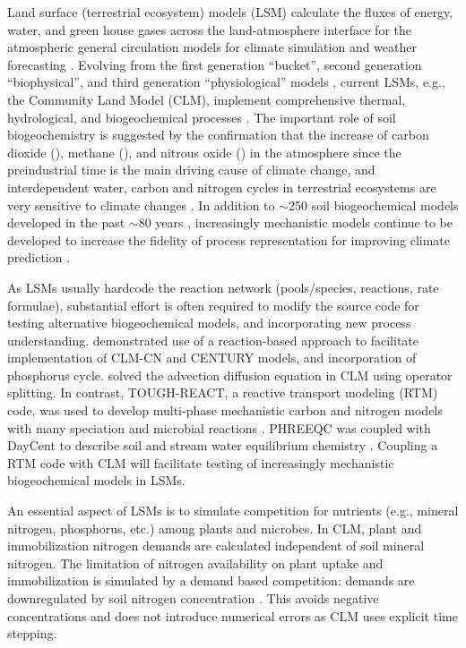 \documentclass[gmd, manuscript]{copernicus}
\begin{document}
\introduction  %
Land surface (terrestrial ecosystem) models (LSM) calculate the fluxes of energy, water, and green house gases across the land-atmosphere interface for
the atmospheric general circulation models for climate simulation and weather forecasting \citep{Sellers1997}. Evolving from the first generation ``bucket'',
second generation ``biophysical'', and third generation ``physiological'' models \citep{Seneviratne2010}, current LSMs, e.g., the Community Land Model (CLM), implement comprehensive thermal, hydrological, and biogeochemical processes \citep{Oleson2013}. The important role of soil biogeochemistry is suggested by the confirmation that the increase of carbon dioxide (), methane (), and nitrous oxide () in the atmosphere since the preindustrial time is the main driving cause of climate change, and interdependent water, carbon and nitrogen cycles in terrestrial ecosystems are very sensitive to climate changes \citep{IPCC2013}. In addition to $\sim$250 soil biogeochemical models developed in the past $\sim$80 years \citep{Manzoni2009}, increasingly mechanistic models continue to be developed to increase the fidelity of process representation for improving
climate prediction \citep[e.g.,][]{Riley2014}. 

As LSMs usually hardcode the reaction network (pools/species, reactions, rate formulae), substantial effort is often required to modify the source code for testing alternative biogeochemical models, and incorporating new process understanding. \citet{Fang2013} demonstrated use of a reaction-based approach to facilitate implementation of CLM-CN and CENTURY models, and incorporation of phosphorus cycle.  \citet{Tang2013b} solved the advection diffusion equation in CLM using operator splitting. In contrast, TOUGH-REACT, a reactive transport modeling (RTM) code, was used to develop multi-phase mechanistic carbon and nitrogen models with many speciation and microbial reactions \citep{Maggi2008,Gu2010,Riley2014}. PHREEQC was coupled with DayCent to describe  soil and stream water equilibrium chemistry  \citep{Hartman2007}. Coupling a RTM code with CLM will facilitate testing of increasingly mechanistic biogeochemical models in LSMs.

An essential aspect of LSMs is to simulate competition for nutrients (e.g., mineral nitrogen, phosphorus, etc.) among plants and microbes. In CLM,  plant and immobilization nitrogen demands are calculated independent of soil mineral nitrogen. The limitation of nitrogen availability on plant uptake and immobilization is simulated by a demand based competition: demands are downregulated by soil nitrogen concentration \citep{Oleson2013,Thornton2005}. This avoids negative concentrations and does not introduce numerical errors \citep{Tang2015} as CLM uses explicit time stepping. 
\end{document}
